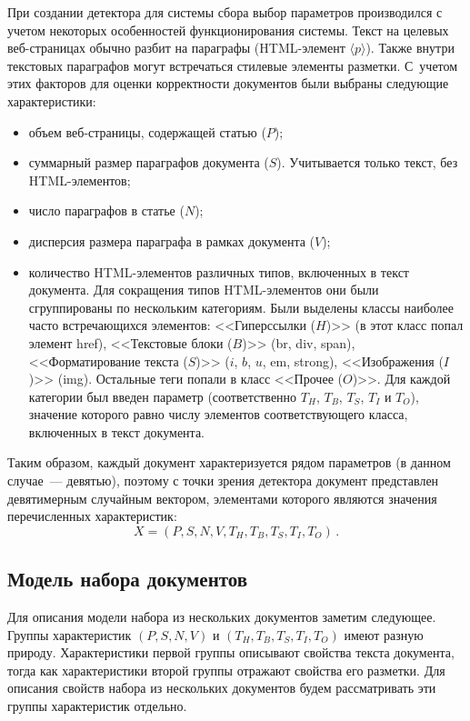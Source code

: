 \begin{multicols}{2}
При создании 
детектора для системы сбора выбор па\-ра\-мет\-ров производился с учетом 
некоторых особенностей функционирования системы. Текст на целевых 
  веб-стра\-ни\-цах обычно разбит на параграфы (HTML-эле\-мент $\langle 
p\rangle$). Также внутри текстовых параграфов могут встречаться стилевые 
элементы разметки. С~учетом этих факторов для \mbox{оценки} корректности 
документов были выбраны следующие характеристики:
  \begin{itemize}
\item объем веб-страницы, содержащей статью ($P$);
\item суммарный размер параграфов документа ($S$). Учитывается только 
текст, без HTML-эле\-мен\-тов;
\item число параграфов в статье ($N$);
\item дисперсия размера параграфа в рамках документа ($V$);
\item количество HTML-эле\-мен\-тов различных типов, включенных в текст 
документа. Для сокращения типов HTML-элементов они были 
сгруппированы по нескольким категориям. Были выделены классы наиболее 
часто встречающихся элементов: <<Гиперссылки ($H$)>> (в этот класс 
попал элемент href), <<Текстовые блоки ($B$)>> (br, div, span), 
<<Форматирование текста ($S$)>> ($i$, $b$, $u$, em, strong), 
<<Изображения ($I$)>> (img). Остальные теги попали в класс <<Прочее 
($O$)>>. Для каждой категории был введен параметр (соответственно 
$T_H$, $T_B$, $T_S$, $T_I$ и $T_O$), значение которого равно числу 
элементов соответствующего класса, включенных в текст документа.
\end{itemize}

    Таким образом, каждый документ характеризуется рядом параметров (в 
данном случае~--- де\-вятью), поэтому с точки зрения детектора документ 
представлен девятимерным случайным вектором, элементами которого 
являются значения пе\-ре\-чис\-лен\-ных характеристик:
  \begin{equation}
  X=(P,S,N,V,T_H,T_B,T_S,T_I,T_O)\,.
  \label{e1-and}
  \end{equation}

\subsection{Модель набора документов}
  
  Для описания модели набора из нескольких документов заметим следующее. 
Группы характеристик $(P, S, N, V)$ и $(T_H, T_B, T_S, T_I, T_O)$ имеют 
разную природу. Характеристики первой группы описывают свойства текста 
документа, тогда как характеристики второй группы отражают свойства его 
разметки. Для описания свойств набора из нескольких документов будем 
рассматривать эти группы характеристик отдельно.
  

\end{multicols}
